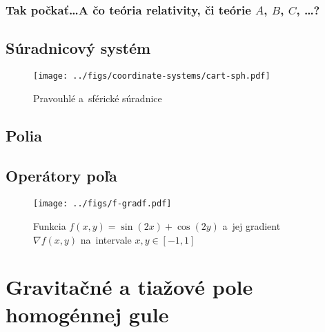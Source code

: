 \documentclass[a4paper, 12pt]{book}
\begin{document}
\subsection{Tak počkať\ldots  A čo teória relativity, či teórie $A$, $B$, $C$, 
\ldots?}







\section{Súradnicový systém}

\begin{figure}[bt]
\centering
\texttt{[image: ../figs/coordinate-systems/cart-sph.pdf]}
\caption{Pravouhlé a~sférické súradnice}
\end{figure}


\section{Polia}

\section{Operátory poľa}





\begin{figure}[bt]
\centering
\texttt{[image: ../figs/f-gradf.pdf]}
\caption{Funkcia $f(x, y) = \sin(2x) + \cos(2y)$ a~jej gradient $\nabla f(x, 
y)$ na~intervale $x, y \in [-1, 1]$}
\end{figure}







\chapter{Gravitačné a tiažové pole homogénnej gule}

\end{document}
